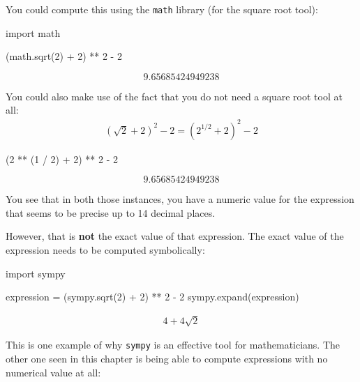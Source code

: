 You could compute this using the \texttt{math} library (for the square root tool):

\begin{pyin}
import math

(math.sqrt(2) + 2) ** 2 - 2
\end{pyin}





\[
9.65685424949238
\]





You could also make use of the fact that you do not need a square root tool at all:
\begin{equation*}
\begin{split}
    (\sqrt{2} + 2) ^ 2 - 2 = (2 ^ {1 / 2} + 2) ^ 2 - 2
\end{split}
\end{equation*}



\begin{pyin}
(2 ** (1 / 2) + 2) ** 2 - 2
\end{pyin}





\[
9.65685424949238
\]


You see that in both those instances, you have a numeric value for the expression
that seems to be precise up to 14 decimal places.


However, that is \textbf{not} the exact value of that expression. The exact value of
the expression needs to be computed symbolically:




\begin{pyin}
import sympy

expression = (sympy.sqrt(2) + 2) ** 2 - 2
sympy.expand(expression)
\end{pyin}




\begin{equation*}
\begin{split}\displaystyle 4 + 4 \sqrt{2}\end{split}
\end{equation*}




This is one example of why \texttt{sympy} is an effective tool for mathematicians.
The other one seen in this chapter is being able to compute expressions with no
numerical value at all:




